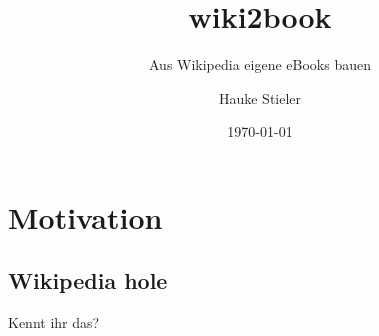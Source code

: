 \documentclass[9pt]{beamer}
\author[Hauke Stieler]{Hauke Stieler}
\title{wiki2book}
\subtitle{Aus Wikipedia eigene eBooks bauen}
\date{\today}
\begin{document}
	{
		\maketitle
	}


	\section{Motivation}	
	
	\subsection{Wikipedia hole}
	
	\begin{frame}
		\begin{center}
			Kennt ihr das?
		\end{center}
	\end{frame}
\end{document}
